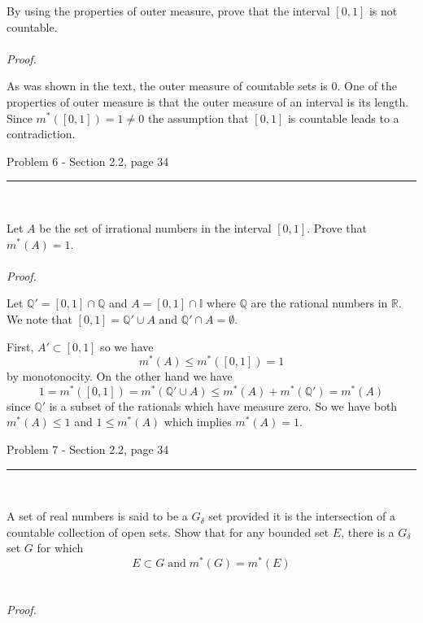 \documentclass[11pt,reqno]{article}
\begin{document}
By using the properties of outer measure, prove that the interval $[0,1]$ is not countable.
\\\\ \emph{Proof.}

As was shown in the text, the outer measure of countable sets is 0. One of the properties of outer measure is that the outer measure of an interval is its length. Since $m^*([0,1])= 1 \neq 0$ the assumption that $[0,1]$ is countable leads to a contradiction.

\begin{flushleft} 
Problem 6 - Section 2.2, page 34\\
\rule{500pt}{1pt}\\
\end{flushleft} 

Let $A$ be the set of irrational numbers in the interval $[0,1]$. Prove that $m^*(A) = 1$.
\\\\ \emph{Proof.}

Let $\mathbb{Q}' = [0,1] \cap \mathbb{Q}$ and  $A = [0,1] \cap \mathbb{I}$ where $\mathbb{Q}$ are the rational numbers in $\mathbb{R}$. We note that $[0,1] = \mathbb{Q}' \cup A$ and $\mathbb{Q}' \cap A = \emptyset$.

First, $A' \subset [0,1]$ so we have 
\[ m^*(A) \le m^*([0,1]) = 1\] 
by monotonocity. On the other hand we have 
\[1 = m^*([0,1]) = m^*(\mathbb{Q}' \cup A) \le  m^*(A) +  m^*(\mathbb{Q}')  =  m^*(A)\]
since $\mathbb{Q}'$ is a subset of the rationals which have measure zero.
So we have both $ m^*(A) \le 1$ and $1 \le m^*(A)$  which implies $m^*(A) = 1$.

\begin{flushleft} 
Problem 7 - Section 2.2, page 34\\
\rule{500pt}{1pt}\\
\end{flushleft} 

A set of real numbers is said to be a $G_\delta$ set provided it is the intersection of a countable collection of open sets. Show that for any bounded set $E$, there is a $G_\delta$ set $G$ for which 
\[ E \subset G \; \text{and} \; m^*(G) = m^*(E) \]
\\\\ \emph{Proof.}
\end{document}
